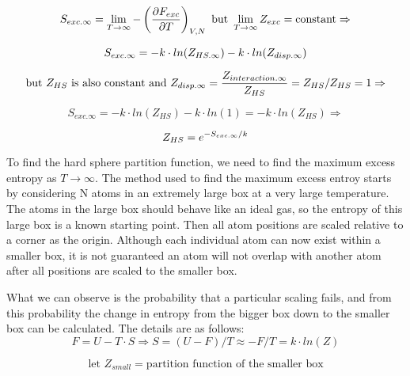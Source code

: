 \begin{equation}\label{eq:MCHS3}
\newline S_{exc.\infty}=\lim_{T\to\infty}-\left ( \frac{\partial F_{exc}}{\partial T} \right ) _{V,N} \text{ but }\lim_{T\to\infty}Z_{exc}=\text{constant}\Rightarrow
\end{equation}

\begin{equation}\label{eq:MCHS4}
\newline S_{exc.\infty}=-k\cdot ln(Z_{HS.\infty})-k\cdot ln(Z_{disp.\infty})
\end{equation}

\begin{equation}\label{eq:MCHS5}
\newline \text{but }Z_{HS}\text{ is also constant and }Z_{disp.\infty}=\frac{Z_{interaction.\infty}}{Z_{HS}}=Z_{HS}/Z_{HS}=1 \Rightarrow
\end{equation}

\begin{equation}\label{eq:MCHS6}
S_{exc.\infty}=-k\cdot ln(Z_{HS})-k\cdot ln(1)=-k\cdot ln(Z_{HS}) \Rightarrow
\end{equation}

\begin{equation}\label{eq:MCHS7}
\newline Z_{HS}=e^{-S_{exc.\infty}/k}
\end{equation}

To find the hard sphere partition function, we need to find the maximum excess entropy as $T\to\infty$. The method used to find the maximum excess entroy starts by considering N atoms in an extremely large box at a very large temperature. The atoms in the large box should behave like an ideal gas, so the entropy of this large box is a known starting point. Then all atom positions are scaled relative to a corner as the origin. Although each individual atom can now exist within a smaller box, it is not guaranteed an atom will not overlap with another atom after all positions are scaled to the smaller box.

What we can observe is the probability that a particular scaling fails, and from this probability the change in entropy from the bigger box down to the smaller box can be calculated. The details are as follows:
\begin{equation}\label{eq:MCHS8}
F=U-T\cdot S \Rightarrow  S=(U-F)/T\approx -F/T=k\cdot ln(Z)
\end{equation}

\begin{equation}\label{eq:MCHS9}
\text{let }Z_{small}=\text{partition function of the smaller box}
\end{equation}

